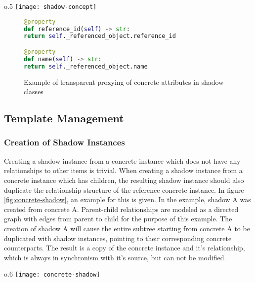         \begin{wrapfigure}{o}{.5\textwidth}
            \centering
            \texttt{[image: shadow-concept]}
            \caption{Schematic depiction of the relationship between concret \& shadow instances}
            \label{fig:shadow-concept}
        \end{wrapfigure}

        \begin{figure}[H]
            \begin{lstlisting}[language=Python,frame=lines,backgroundcolor=\color{background},firstnumber=285]
@property
def reference_id(self) -> str:
return self._referenced_object.reference_id

@property
def name(self) -> str:
return self._referenced_object.name
            \end{lstlisting}
            \caption{Example of transparent proxying of concrete attributes in shadow classes}
        \end{figure}

\subsection{Template Management}

    \subsubsection{Creation of Shadow Instances}
        Creating a shadow instance from a concrete instance which
        does not have any relationships to other items is trivial.
        When creating a shadow instance from a concrete instance
        which has children, the resulting shadow
        instance should also duplicate the relationship structure
        of the reference concrete instance. In figure \ref{fig:concrete-shadow},
        an example for this is given. In the example, shadow A
        was created from concrete A. Parent-child relationships
        are modeled as a directed graph with edges from parent to child for the 
        purpose of this example. The creation of shadow A will cause the
        entire subtree starting from concrete A to be duplicated
        with shadow instances, pointing to their corresponding
        concrete counterparts. The result is a copy of the
        concrete instance and it's relationship, which is always
        in synchronism with it's source, but can not be modified.

        \begin{wrapfigure}{o}{.6\textwidth}
            \centering
            \texttt{[image: concrete-shadow]}
            \caption{Shadow instances duplicate the concrete items' structure}
            \label{fig:concrete-shadow}
        \end{wrapfigure}

